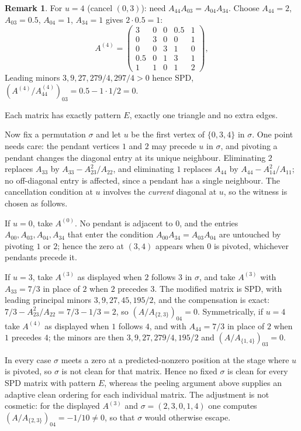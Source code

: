 \documentclass[11pt]{article}
\theoremstyle{plain}
\theoremstyle{definition}
\newtheorem{remark}[theorem]{Remark}
\begin{document}
\begin{aiblock}
\begin{remark}
For $u=4$ (cancel $(0,3)$): need $A_{44}A_{03}=A_{04}A_{34}$. Choose $A_{44}=2$, $A_{03}=0.5$, $A_{04}=1$, $A_{34}=1$ gives $2\cdot0.5=1$:
\[
A^{(4)}=\begin{pmatrix}
3&0&0&0.5&1\\
0&3&0&0&1\\
0&0&3&1&0\\
0.5&0&1&3&1\\
1&1&0&1&2
\end{pmatrix},
\]
Leading minors $3,9,27,279/4,297/4>0$ hence SPD, $(A^{(4)}/A^{(4)}_{44})_{03}=0.5-1\cdot1/2=0$.

Each matrix has exactly pattern $E$, exactly one triangle and no extra edges.

Now fix a permutation $\sigma$ and let $u$ be the first vertex of $\{0,3,4\}$ in $\sigma$. One point
needs care: the pendant vertices $1$ and $2$ may precede $u$ in $\sigma$, and pivoting a pendant
changes the diagonal entry at its unique neighbour. Eliminating $2$ replaces $A_{33}$ by
$A_{33}-A_{23}^2/A_{22}$, and eliminating $1$ replaces $A_{44}$ by $A_{44}-A_{14}^2/A_{11}$; no
off-diagonal entry is affected, since a pendant has a single neighbour. The cancellation condition at
$u$ involves the \emph{current} diagonal at $u$, so the witness is chosen as follows.

If $u=0$, take $A^{(0)}$. No pendant is adjacent to $0$, and the entries $A_{00},A_{03},A_{04},A_{34}$
that enter the condition $A_{00}A_{34}=A_{03}A_{04}$ are untouched by pivoting $1$ or $2$; hence the
zero at $(3,4)$ appears when $0$ is pivoted, whichever pendants precede it.

If $u=3$, take $A^{(3)}$ as displayed when $2$ follows $3$ in $\sigma$, and take $A^{(3)}$ with
$A_{33}=7/3$ in place of $2$ when $2$ precedes $3$. The modified matrix is SPD, with leading
principal minors $3,9,27,45,195/2$, and the compensation is exact: $7/3-A_{23}^2/A_{22}=7/3-1/3=2$, so
$(A/A_{\{2,3\}})_{04}=0$. Symmetrically, if $u=4$ take $A^{(4)}$ as displayed when $1$ follows $4$,
and with $A_{44}=7/3$ in place of $2$ when $1$ precedes $4$; the minors are then
$3,9,27,279/4,195/2$ and $(A/A_{\{1,4\}})_{03}=0$.

In every case $\sigma$ meets a zero at a predicted-nonzero position at the stage where $u$ is
pivoted, so $\sigma$ is not clean for that matrix. Hence no fixed $\sigma$ is clean for every SPD
matrix with pattern $E$, whereas the peeling argument above supplies an adaptive clean ordering for
each individual matrix. The adjustment is not cosmetic: for the displayed $A^{(3)}$ and
$\sigma=(2,3,0,1,4)$ one computes $(A/A_{\{2,3\}})_{04}=-1/10\neq0$, so that $\sigma$ would otherwise
escape.
\end{remark}
\end{aiblock}
\end{document}
